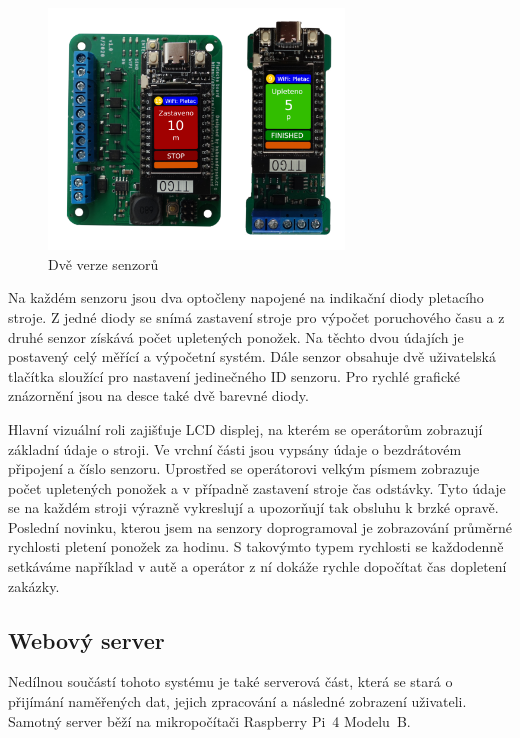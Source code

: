 \documentclass[12pt, a4paper]{article}
\begin{document}
\begin{figure}[t]
    \centering
    \includegraphics[width=0.7\textwidth]{img/oba.png}
    \caption{Dvě verze senzorů}
    \label{fig:dveVerze}
\end{figure}

Na každém senzoru jsou dva optočleny napojené na indikační diody pletacího stroje.
Z jedné diody se snímá zastavení stroje pro výpočet poruchového času a z druhé senzor získává počet upletených ponožek.
Na těchto dvou údajích je postavený celý měřící a výpočetní systém.
Dále senzor obsahuje dvě uživatelská tlačítka sloužící pro nastavení jedinečného ID senzoru.
Pro rychlé grafické znázornění jsou na desce také dvě barevné diody.

Hlavní vizuální roli zajišťuje LCD displej, na kterém se operátorům zobrazují základní údaje o stroji.
Ve vrchní části jsou vypsány údaje o bezdrátovém připojení a číslo senzoru.
Uprostřed se operátorovi velkým písmem zobrazuje počet upletených ponožek a v případně zastavení stroje čas odstávky.
Tyto údaje se na každém stroji výrazně vykreslují a upozorňují tak obsluhu k brzké opravě.
Poslední novinku, kterou jsem na senzory doprogramoval je zobrazování průměrné rychlosti pletení ponožek za hodinu.
S takovýmto typem rychlosti se každodenně setkáváme například v autě a operátor z ní dokáže rychle dopočítat čas dopletení zakázky. 


\subsection*{Webový server}

Nedílnou součástí tohoto systému je také serverová část, která se stará o přijímání naměřených dat, jejich zpracování a následné zobrazení uživateli.
Samotný server běží na mikropočítači Raspberry Pi~4 Modelu~B.
\end{document}
